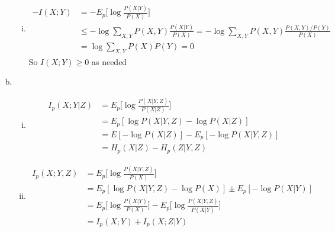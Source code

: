 \documentclass{article}
\begin{document}
\begin{enumerate}[(a)]
\begin{enumerate}[(i)]
        \item \begin{align*}
            -I(X;Y) &= -E_p\bigg[\log \frac{P(X|Y)}{P(X)}\bigg] \\
            &\leq -\log \sum_{X, Y} P(X, Y) \frac{P(X|Y)}{P(X)} = -\log \sum_{X, Y} P(X, Y)\frac{P(X,Y)/P(Y)}{P(X)} \\
            &= \log \sum_{X, Y}P(X)P(Y) = 0
        \end{align*}
        So $I(X;Y) \geq 0$ as needed
    \end{enumerate}
    \item  \begin{enumerate}[(i)]
        \item \begin{align*}
            I_p(X;Y|Z) &= E_p \bigg[ \log \frac{P(X|Y,Z)}{P(X|Z)}\bigg] \\[0.25ex]
            &= E_p [ \log P(X|Y,Z) - \log P(X|Z)] \\
            &= E[-\log P(X|Z)] - E_p[-\log P(X|Y,Z)] \\
            &= H_p(X|Z) - H_p(Z|Y,Z)
        \end{align*}
        \item \begin{align*}
            I_p(X;Y,Z) &= E_p\bigg[\log \frac{P(X|Y,Z)}{P(X)}\bigg] \\
            &= E_p[\log P(X|Y,Z) - \log P(X)] \pm  E_p[-\log P(X|Y)] \\
            &= E_p \bigg[\log \frac{P(X|Y)}{P(X)}\bigg] - E_p \bigg[\log \frac{P(X|Y,Z)}{P(X|Y)}\bigg] \\
            &= I_p(X;Y) + I_p(X;Z|Y)
        \end{align*}
    \end{enumerate}
\end{enumerate}
\end{document}
